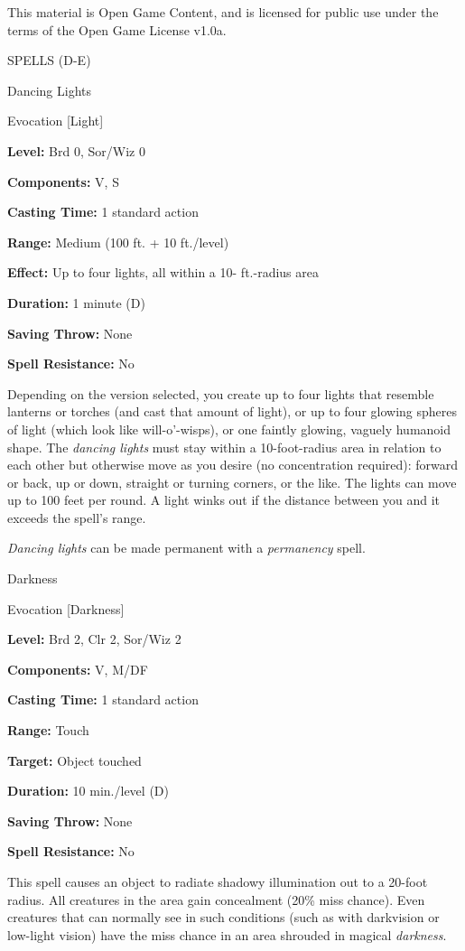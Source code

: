 \documentclass{article}
\begin{document}
This material is Open Game Content, and is licensed for public use under the terms 
of the Open Game License v1.0a.

{\LARGE{}SPELLS (D-E)}

\vspace{12pt}
Dancing Lights

Evocation [Light]

\textbf{Level:} Brd 0, Sor/Wiz 0

\textbf{Components:} V, S

\textbf{Casting Time:} 1 standard action

\textbf{Range: }Medium (100 ft. + 10 ft./level)

\textbf{Effect:} Up to four lights, all within a 10- ft.-radius area

\textbf{Duration:} 1 minute (D)

\textbf{Saving Throw:} None

\textbf{Spell Resistance:} No

Depending on the version selected, you create up to four lights that resemble lanterns 
or torches (and cast that amount of light), or up to four glowing spheres of light 
(which look like will-o'-wisps), or one faintly glowing, vaguely humanoid shape. 
The \textit{dancing lights }must stay within a 10-foot-radius area in relation 
to each other but otherwise move as you desire (no concentration required): forward 
or back, up or down, straight or turning corners, or the like. The lights can move 
up to 100 feet per round. A light winks out if the distance between you and it 
exceeds the spell's range.

\textit{Dancing lights }can be made permanent with a \textit{permanency }spell.

\vspace{12pt}
Darkness

Evocation [Darkness]

\textbf{Level:} Brd 2, Clr 2, Sor/Wiz 2

\textbf{Components:} V, M/DF

\textbf{Casting Time:} 1 standard action

\textbf{Range:} Touch

\textbf{Target:} Object touched

\textbf{Duration:} 10 min./level (D)

\textbf{Saving Throw:} None

\textbf{Spell Resistance:} No

This spell causes an object to radiate shadowy illumination out to a 20-foot radius. 
All creatures in the area gain concealment (20\% miss chance). Even creatures that 
can normally see in such conditions (such as with darkvision or low-light vision) 
have the miss chance in an area shrouded in magical \textit{darkness}.
\end{document}
